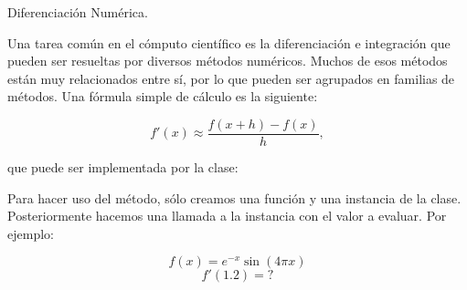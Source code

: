 \begin{code} Diferenciación Numérica.

Una tarea común en el cómputo científico es la diferenciación e
integración que pueden ser resueltas por diversos métodos numéricos.
Muchos de esos métodos están muy relacionados entre sí, por lo que
pueden ser agrupados en familias de métodos. Una fórmula simple de
cálculo es la siguiente:

\[ f'(x) \approx \dfrac{f(x+h) - f(x)}{h}, \]

que puede ser implementada por la clase:

\begin{Shaded}
\begin{Highlighting}[]
     \NormalTok{(}\OperatorTok{=}\NormalTok{):}
        \OperatorTok{=}
        \OperatorTok{=} 

     \NormalTok{(}
\OperatorTok{=} 
        \OperatorTok{+}\OperatorTok{{-}}\OperatorTok{/}
\end{Highlighting}
\end{Shaded}

Para hacer uso del método, sólo creamos una función y una instancia de
la clase. Posteriormente hacemos una llamada a la instancia con el valor
a evaluar. Por ejemplo:

\[ f(x) = e^{-x} \sin \left(4\pi x\right) \] \[ f'(1.2) = ?\]

\begin{Shaded}
\begin{Highlighting}[]

    \OperatorTok{{-}}\OperatorTok{*}\OperatorTok{*}\OperatorTok{*}

\OperatorTok{=}
\NormalTok{))}
\end{Highlighting}
\end{Shaded}


\end{code}
